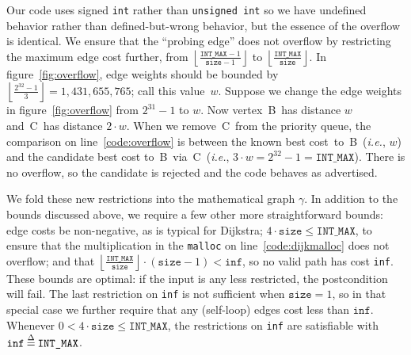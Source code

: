Our code uses signed \texttt{int} rather than \texttt{unsigned int} so we have undefined behavior rather than defined-but-wrong behavior, but the essence of the overflow is identical.  We ensure that the ``probing edge'' does not overflow by restricting the maximum edge cost further, from $\left\lfloor\frac{\texttt{INT\_MAX}-1}{\texttt{size}-1}\right\rfloor$ to $\left\lfloor\frac{\texttt{INT\_MAX}}{\texttt{size}}\right\rfloor$.  In  figure~\ref{fig:overflow}, edge weights should be bounded by $\left\lfloor\frac{2^{32}-1}{3}\right\rfloor=1,\!431,\!655,\!765$; call this value~$w$.  Suppose we change the edge weights in figure~\ref{fig:overflow} from $2^{31}-1$ to $w$.  Now vertex~B~has distance $w$ and~C~has distance $2 \cdot w$.  When we remove~C~from the priority queue, the comparison on line~\ref{code:overflow} is between the known best cost~to~B~(\emph{i.e.}, $w$) and the candidate best cost to~B~via~C~(\emph{i.e.}, $3 \cdot w=2^{32} - 1 = \texttt{INT\_MAX}$).  There is no overflow, so the candidate is rejected and the code behaves as advertised.


We fold these new restrictions into the mathematical graph $\gamma$. %
In addition to the bounds discussed above, we require a few other more straightforward bounds: edge costs be non-negative, as is typical for Dijkstra; $4 \cdot \texttt{size} \le \texttt{INT\_MAX}$, to ensure that the multiplication in the \texttt{malloc} on line~\ref{code:dijkmalloc} does not overflow; and that $\left\lfloor \frac{\texttt{INT\_MAX}}{\texttt{size}}\right\rfloor \cdot (\texttt{size} - 1) < \texttt{inf}$, so no valid path has cost \texttt{inf}.
These bounds are optimal: if the input is any less restricted, the postcondition will fail.  The last restriction on \texttt{inf} is not sufficient when $\texttt{size} = 1$, so in that special case we further require that any (self-loop) edges cost less than $\texttt{inf}$.
Whenever
$0 < 4 \cdot \texttt{size} \le \texttt{INT\_MAX}$, the restrictions on \texttt{inf} are satisfiable with $\texttt{inf} \mathbin{\stackrel{\Delta}{=}} \texttt{INT\_MAX}$.



